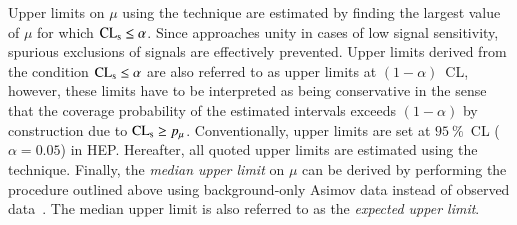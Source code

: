 Upper limits on $\mu$ using the \CLs technique are estimated by finding the
largest value of $\mu$ for which $\text{CL}_{\text{s}} \leq \alpha$. Since \CLs approaches unity
in cases of low signal sensitivity, spurious exclusions of signals are
effectively prevented. Upper limits derived from the condition
$\text{CL}_{\text{s}} \leq \alpha$ are also referred to as upper limits at $(1 - \alpha)$~CL,
however, these limits have to be interpreted as being conservative in the sense
that the coverage probability of the estimated intervals exceeds $(1 - \alpha)$
by construction due to $\text{CL}_{\text{s}} \geq p_\mu$. Conventionally, upper limits are set
at $\SI{95}{\percent}$~CL ($\alpha = 0.05$) in HEP. Hereafter, all quoted upper
limits are estimated using the \CLs technique. Finally, the \emph{median upper
  limit} on $\mu$ can be derived by performing the procedure outlined above
using background-only Asimov data instead of observed
data~\cite{Cowan:2010js}. The median upper limit is also referred to as the
\emph{expected upper limit}.




